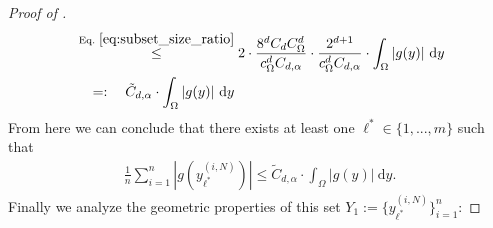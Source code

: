 \documentclass[a4paper, 10pt]{article}
\begin{document}
\begin{proof}[Proof of ]
\begin{align*}
&\stackrel{\text{Eq.\ }\eqref{eq:subset_size_ratio}}{\leq} 2 \cdot \frac{8^d C_d C_\Omega^d}{c_\Omega^d C_{d, \alpha}} \cdot \frac{2^{d+1}}{c_\Omega^{d} C_{d, \alpha}} \cdot \int_{\Omega} |g(y)| ~ \mathrm{d}y \\
&~~~=:~~~ \tilde{C}_{d, \alpha} \cdot \int_{\Omega} |g(y)| ~ \mathrm{d}y \\
\end{align*}
From here we can conclude that there exists at least one $\ell^* \in \{ 1, ..., m \}$ such that
\begin{align}
\label{eq:desired_estimate_2}
\frac{1}{n} \sum_{i=1}^n |g(y_{\ell^*}^{(i, N)})| \leq \tilde{C}_{d, \alpha} \cdot \int_{\Omega} |g(y)| ~ \mathrm{d}y.
\end{align}
Finally we analyze the geometric properties of this set $Y_1 := \{ y_{\ell^*}^{(i,N)} \}_{i=1}^n$:
%


\end{proof}
\end{document}
